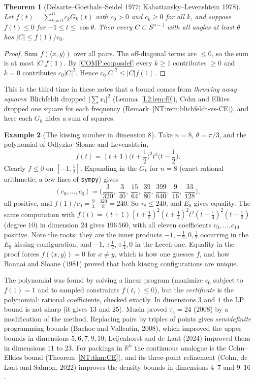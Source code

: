 \documentclass[11pt,openany]{book}
\theoremstyle{plain}
\newtheorem{theorem}{Theorem}[chapter]
\theoremstyle{definition}
\newtheorem{example}[theorem]{Example}
\theoremstyle{remark}
\newcommand{\R}{\mathbb{R}}
\newcommand{\abs}[1]{\left\lvert #1 \right\rvert}
\newcommand{\ip}[2]{\langle #1, #2\rangle}
\newcommand{\kiss}{\tau}               %
\begin{document}
\begin{theorem}[Delsarte--Goethals--Seidel 1977; Kabatiansky--Levenshtein 1978]\label{COMP:thm:LP}
Let $f(t)=\sum_{k=0}^Dc_kG_k(t)$ with $c_0>0$ and $c_k\ge0$ for all $k$, and suppose $f(t)\le0$ for
$-1\le t\le\cos\theta$. Then every $C\subset S^{n-1}$ with all angles at least $\theta$ has
$\abs C\le f(1)/c_0$.
\end{theorem}

\begin{proof}
Sum $f(\ip xy)$ over all pairs. The off-diagonal terms are $\le0$, so the sum is at most $\abs Cf(1)$. By
\eqref{COMP:eq:posdef} every $k\ge1$ contributes $\ge0$ and $k=0$ contributes $c_0\abs C^2$. Hence
$c_0\abs C^2\le\abs Cf(1)$.
\end{proof}

This is the third time in these notes that a bound comes from \emph{throwing away squares}: Blichfeldt
dropped $\abs{\sum x_i}^2$ (Lemma~\ref{L2:lem:f0}), Cohn and Elkies dropped one square for each
frequency (Remark~\ref{NT:rem:blichfeldt-vs-CE}), and here each $G_k$ hides a sum of squares.

\begin{example}[The kissing number in dimension $8$]\label{COMP:ex:240}
Take $n=8$, $\theta=\pi/3$, and the polynomial of Odlyzko--Sloane and Levenshtein,
\[
  f(t)=(t+1)\Big(t+\frac12\Big)^2t^2\Big(t-\frac12\Big).
\]
Clearly $f\le0$ on $[-1,\frac12]$. Expanding in the $G_k$ for $n=8$ (exact rational arithmetic; a few lines of
\texttt{sympy}) gives
\[
  (c_0,\dots,c_6)=\Big(\frac3{320},\ \frac3{40},\ \frac{15}{64},\ \frac{39}{80},\ \frac{399}{640},\ \frac9{16},\
  \frac{33}{128}\Big),
\]
all positive, and $f(1)/c_0=\frac94\cdot\frac{320}3=240$. So $\kiss_8\le240$, and $E_8$ gives equality.
The same computation with
$f(t)=(t+1)(t+\frac12)^2(t+\frac14)^2t^2(t-\frac14)^2(t-\frac12)$ (degree $10$) in dimension $24$ gives
$196\,560$, with all eleven coefficients $c_0,\dots,c_{10}$ positive. Note the roots: they are the inner products $-1,-\frac12,0,\frac12$
occurring in the $E_8$ kissing configuration, and $-1,\pm\frac12,\pm\frac14,0$ in the Leech one. Equality in
the proof forces $f(\ip xy)=0$ for $x\ne y$, which is how one guesses $f$, and how Bannai and Sloane
(1981) proved that both kissing configurations are unique.
\end{example}

The polynomial was found by solving a linear program (maximize $c_0$ subject to $f(1)=1$ and to
sampled constraints $f(t_\ell)\le0$), but the \emph{certificate} is the polynomial: rational coefficients,
checked exactly. In dimensions $3$ and $4$ the LP bound is not sharp (it gives $13$ and $25$). Musin
proved $\kiss_4=24$ (2008) by a modification of the method. Replacing pairs by triples of points gives
\emph{semidefinite} programming bounds (Bachoc and Vallentin, 2008), which improved the upper bounds in
dimensions $5,6,7,9,10$; Leijenhorst and de Laat (2024) improved them in dimensions $11$ to $23$. For
packings in $\R^n$ the continuous analogue is the Cohn--Elkies bound (Theorem~\ref{NT:thm:CE}), and its
three-point refinement (Cohn, de Laat and Salmon, 2022) improves the density bounds in dimensions $4$--$7$
and $9$--$16$.
\end{document}
